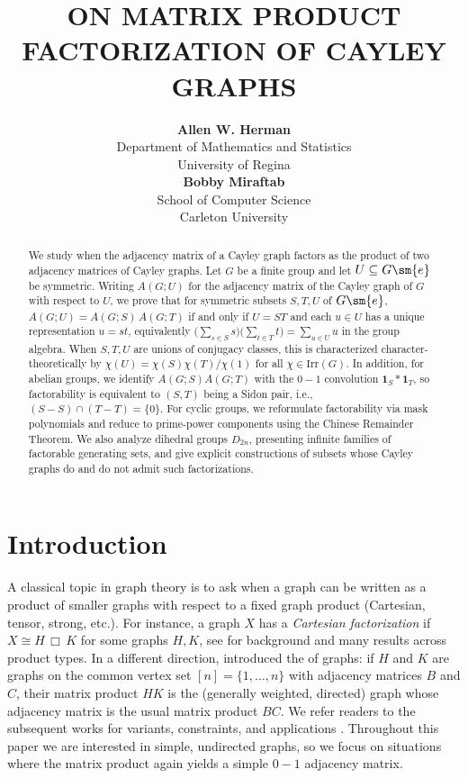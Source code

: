 \documentclass{file}
\title{\centering\MakeUppercase{On Matrix Product Factorization of Cayley graphs}}%
\author{
\begin{tabular}{c}
\textbf{Allen W. Herman} \\[3pt]
Department of Mathematics and Statistics \\ 
University of Regina
\end{tabular}
\quad\quad
\begin{tabular}{c}
\textbf{Bobby Miraftab} \\[3pt]
School of Computer Science \\ 
Carleton University
\end{tabular}
}
\date{}
\begin{document}
\maketitle


\begin{abstract}
We study when the adjacency matrix of a Cayley graph factors as the product of two adjacency matrices of Cayley graphs. Let $G$ be a finite group and let $U\subseteq G\sm \{e\}$ be symmetric. 
Writing $A(G;U)$ for the adjacency matrix of the Cayley graph of $G$ with respect to $U$, we prove that for symmetric subsets $S,T,U$ of  $G\sm \{e\}$, $A(G;U)=A(G;S)\,A(G;T)$
if and only if $U=ST$ and each $u\in U$ has a unique representation $u=st$,
equivalently $\bigl(\sum_{s\in S}s\bigr)\bigl(\sum_{t\in T}t\bigr)=\sum_{u\in U}u$ in the group algebra. When $S,T,U$ are unions of conjugacy classes, this is characterized character-theoretically by $\chi(U)=\chi(S)\chi(T)/\chi(1)$ for all $\chi\in\mathrm{Irr}(G)$. 
In addition, for abelian groups, we identify $A(G;S)A(G;T)$ with the $0\!-\!1$ convolution $\mathbf{1}_S*\mathbf{1}_T$, so factorability is equivalent to $(S,T)$ being a Sidon pair, i.e., $(S-S)\cap(T-T)=\{0\}$. 
For cyclic groups, we reformulate factorability via mask polynomials and reduce to prime-power components using the Chinese Remainder Theorem. 
We also analyze dihedral groups $D_{2n}$, presenting infinite families of factorable generating sets, and give explicit constructions of subsets whose Cayley graphs do and do not admit such factorizations.
\end{abstract}


\section{Introduction}

A classical topic in graph theory is to ask when a graph can be written as a product of smaller graphs with respect to a fixed graph product (Cartesian, tensor, strong, etc.).  
For instance, a graph $X$ has a \emph{Cartesian factorization} if $X \cong H \,\Box\, K$ for some graphs $H,K$, see \citet{MR2817074} for background and many results across product types.
In a different direction, \citet{Manjunatha} introduced the  of graphs: if $H$ and $K$ are graphs on the common vertex set $[n]=\{1,\dots,n\}$ with adjacency matrices $B$ and $C$, their matrix product $HK$ is the (generally weighted, directed) graph whose adjacency matrix is the usual matrix product $BC$.  
We refer readers to the subsequent works for variants, constraints, and applications \cite{maghsoudi2023matrix,akbari2025spectral,miraftab2025factorability}.
Throughout this paper we are interested in simple, undirected graphs, so we focus on situations where the matrix product again yields a simple $0\!-\!1$ adjacency matrix.
\end{document}
